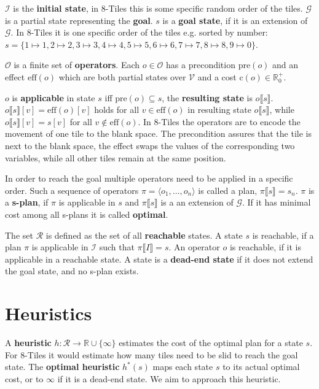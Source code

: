 $\mathcal{I}$ is the \textbf{initial state}, in 8-Tiles this is some specific random order of the tiles.
$\mathcal{G}$ is a partial state representing the \textbf{goal}. $s$ is a \textbf{goal state}, if it is an extension of $\mathcal{G}$.
In 8-Tiles it is one specific order of the tiles e.g. sorted by number:
$s = \{1\mapsto1, 2\mapsto2, 3\mapsto3, 4\mapsto4, 5\mapsto5, 6\mapsto6, 7\mapsto7, 8\mapsto8, 9\mapsto0\}$.

$\mathcal{O}$ is a finite set of \textbf{operators}.
Each $o\in\mathcal{O}$ has a precondition $\text{pre}(o)$ and an effect $\text{eff}(o)$ which are both partial states over $\mathcal{V}$ and a cost $\text{c}(o)\in\mathbb{R}^+_0$.

$o$ is \textbf{applicable} in state $s$ iff $\text{pre}(o)\subseteq s$, the \textbf{resulting state} is $o\llbracket s\rrbracket$.
$o\llbracket s\rrbracket[v] = \text{eff}(o)[v]$ holds for all $v\in \text{eff}(o)$ in resulting state $o\llbracket s\rrbracket$, while $o\llbracket s\rrbracket[v]=s[v]$ for all $v\notin \text{eff}(o)$.
In 8-Tiles the operators are to encode the movement of one tile to the blank space.
The precondition assures that the tile is next to the blank space, the effect swaps the values of the corresponding two variables, while all other tiles remain at the same position.

In order to reach the goal multiple operators need to be applied in a specific order.
Such a sequence of operators $\pi=\langle o_1,\dots, o_n\rangle$ is called a plan, $\pi\llbracket s\rrbracket = s_n$.
$\pi$ is a \textbf{s-plan}, if $\pi$ is applicable in $s$ and $\pi\llbracket s\rrbracket$ is a an extension of $\mathcal{G}$.
If it has minimal cost among all s-plans it is called \textbf{optimal}.

The set $\mathcal{R}$ is defined as the set of all \textbf{reachable} states.
A state $s$ is reachable, if a plan $\pi$ is applicable in $\mathcal{I}$ such that $\pi\llbracket I\rrbracket = s$.
An operator $o$ is reachable, if it is applicable in a reachable state.
A state is a \textbf{dead-end state} if it does not extend the goal state, and no s-plan exists.

\section{Heuristics}\label{sec:heuristics}
A \textbf{heuristic} $h:\mathcal{R} \rightarrow \mathbb{R} \cup \{\infty\} $ estimates the cost of the optimal plan for a state $s$.
For 8-Tiles it would estimate how many tiles need to be slid to reach the goal state.
The \textbf{optimal heuristic} $h^*(s)$ maps each state $s$  to its actual optimal cost, or to $\infty$ if it is a dead-end state.
We aim to approach this heuristic.

